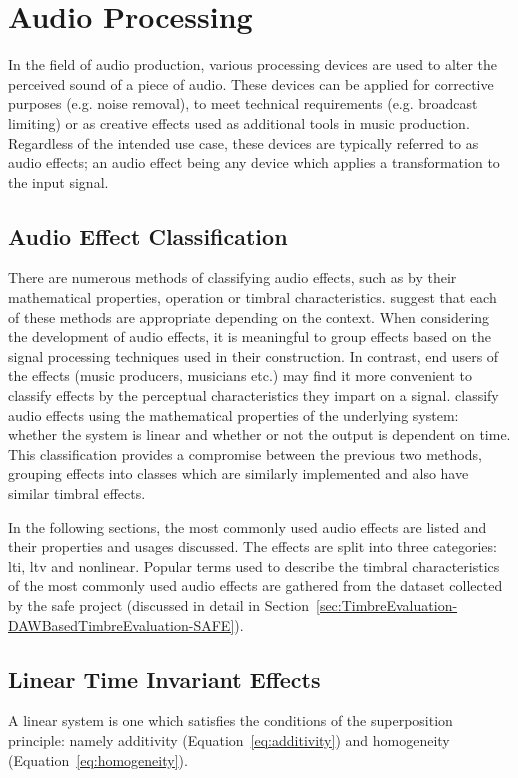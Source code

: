 \section{Audio Processing}
\label{sec:Timbre-AudioProcessing}
	In the field of audio production, various processing devices are used to alter the perceived sound of a piece of
	audio. These devices can be applied for corrective purposes (e.g. noise removal), to meet technical requirements
	(e.g. broadcast limiting) or as creative effects used as additional tools in music production. Regardless of the
	intended use case, these devices are typically referred to as audio effects; an audio effect being any device which
	applies a transformation to the input signal.
	
	\subsection{Audio Effect Classification}
	\label{sec:Timbre-AudioProcessing-Classification}
		There are numerous methods of classifying audio effects, such as by their mathematical properties,
		operation or timbral characteristics. \citet{verfaille2006an} suggest that each of these methods are
		appropriate depending on the context. When considering the development of audio effects, it is meaningful
		to group effects based on the signal processing techniques used in their construction. In contrast, end
		users of the effects (music producers, musicians etc.) may find it more convenient to classify effects by
		the perceptual characteristics they impart on a signal. \citet{eichas2015feature} classify audio effects
		using the mathematical properties of the underlying system: whether the system is linear and whether or not
		the output is dependent on time. This classification provides a compromise between the previous two
		methods, grouping effects into classes which are similarly implemented and also have similar timbral
		effects.
		
		In the following sections, the most commonly used audio effects are listed and their properties and usages
		discussed. The effects are split into three categories: \acrfull{lti}, \acrfull{ltv} and nonlinear. Popular
		terms used to describe the timbral characteristics of the most commonly used audio effects are gathered
		from the dataset collected by the \acrshort{safe} project (discussed in detail in
		Section~\ref{sec:TimbreEvaluation-DAWBasedTimbreEvaluation-SAFE}).

	\subsection{Linear Time Invariant Effects}
	\label{sec:Timbre-AudioProcessing-LTI}
		A linear system is one which satisfies the conditions of the superposition principle: namely additivity
		(Equation~\ref{eq:additivity}) and homogeneity (Equation~\ref{eq:homogeneity}).

